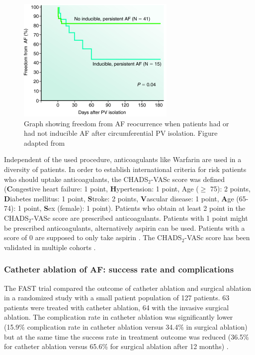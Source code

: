 \begin{figure}[H]
\begin{center}
\includegraphics[scale=1]{./teile/introduction/freedom_recurrence_AF.png}
\caption{Graph showing freedom from AF reocurrence when patients had or had not inducible AF after circumferential PV isolation. Figure adapted 
from \cite{Ora04}}
\label{freedom_recurrence}
\end{center}
\end{figure}


\vspace*{-0.4cm}

Independent of the used procedure, anticoagulants like Warfarin are used in a diversity of patients. In order to establish international 
criteria for risk patients who should uptake anticoagulants, the CHADS$_{2}$-VASc score was defined \cite{ESC12} 
(\textbf{C}ongestive heart failure: 1 point, \textbf{H}ypertension: 1 point, {A}ge ($\geq$ 75): 2 points, \textbf{D}iabetes mellitus: 1 point, 
\textbf{S}troke: 2 points, \textbf{V}ascular disease: 1 point, \textbf{A}ge (65-74): 1 point, \textbf{S}ex (female): 1 point). 
Patients who obtain at least 2 point in the CHADS$_{2}$-VASc score are prescribed anticoagulants. Patients with 1 point might be prescribed 
anticoagulants, alternatively aspirin can be used. Patients with a score of 0 are supposed to only take aspirin \cite{Fle}. The 
CHADS$_{2}$-VASc score has been validated in multiple cohorts \cite{Lip11, Pot12, Ole12, Van11, Fri12, Ole11, Bor11}.


\newpage

\subsubsection*{Catheter ablation of AF: success rate and complications}

The FAST trial compared the outcome of catheter ablation and surgical ablation in a randomized study with a small patient population of 127 
patients. 63 patients were treated with catheter ablation, 64 with the invasive surgical ablation. 
The complication rate in catheter ablation was significantly lower (15.9\% complication rate in catheter ablation versus 34.4\% in surgical 
ablation) but at the same time the success rate in treatment outcome was reduced (36.5\% for catheter ablation versus 65.6\% for surgical 
ablation after 12 months) \cite{Boe12}. \newline

